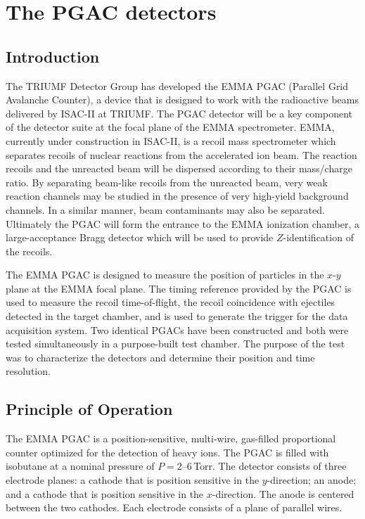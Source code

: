 \section{The PGAC detectors}
\subsection{Introduction}
The TRIUMF Detector Group has developed the EMMA PGAC (Parallel Grid Avalanche Counter), a device that is designed to work with the radioactive beams delivered by ISAC-II at TRIUMF.  The PGAC detector will be a key component of the detector suite at the focal plane of the EMMA spectrometer.
EMMA, currently under construction in ISAC-II,  is a recoil mass spectrometer 
which %
 separates recoils of nuclear reactions from the accelerated ion beam.  The reaction recoils and the unreacted beam will be dispersed  according to their mass/charge ratio.  By separating beam-like recoils from the unreacted beam, very weak reaction channels may be studied in the presence of very high-yield background channels.  In a similar manner, beam contaminants may also be separated.  Ultimately the PGAC will form the entrance to the EMMA ionization chamber, a large-acceptance Bragg detector which will be used to provide $Z$-identification of the  recoils.

The EMMA PGAC is designed to measure the position of particles in the $x$-$y$ plane at the EMMA focal plane. %
  The timing reference provided by the PGAC is used to measure the recoil time-of-flight, the recoil coincidence with ejectiles detected in the target chamber, and is used to generate the trigger for the data acquisition system. 
Two identical PGACs have been constructed and both were tested simultaneously in a purpose-built test chamber.  The purpose of the test was to characterize the detectors and determine their position and time resolution.

\subsection{Principle of Operation}
The EMMA PGAC is a position-sensitive, multi-wire, gas-filled proportional counter optimized for the detection of heavy ions.  The PGAC is filled with isobutane at a nominal pressure of $P=2$--6\,Torr.\footnotemark[3] %
%
The detector consists of three electrode planes: a cathode that is position sensitive in the $y$-direction; an anode; and a cathode that is position sensitive in the $x$-direction.  The anode is centered between the two cathodes.  Each electrode consists of a plane of parallel wires.

